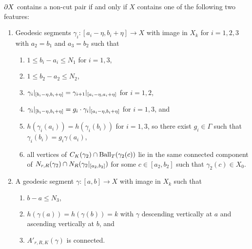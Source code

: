 \begin{prop}\label{prop:noncutpairfeature} $\partial X$ contains a non-cut
pair if and only if $X$ contains one of the following two features:
\begin{enumerate}
  \item Geodesic segments $\gamma_i \colon [a_i - \eta, b_i + \eta] \to X$ with
    image in $X_k$ for $i = 1, 2, 3$ with $a_2 = b_1$ and $a_3 = b_2$ such that
    \begin{enumerate}
      \item\label{noncutpairshortout} $1 \leq b_i - a_i \leq N_1$ for $i = 1,
        3$,
      \item\label{noncutpairshortin} $1 \leq b_2 - a_2 \leq N_2$,
      \item\label{noncutpairlocal1} $\gamma_i\vert_{[b_i - \eta, b_i +
        \eta]} = \gamma_{i+1}\vert_{[a_i - \eta, a_i + \eta]}$ for $i = 1,
        2$,
      \item\label{noncutpairlocal2} $\gamma_i\vert_{[b_i - \eta, b_i +
        \eta]} = g_i \cdot\gamma_i\vert_{[a_i - \eta, b_i + \eta]}$ for $i
        = 1, 3$, and
      \item\label{noncutpairdepth} $h(\gamma_i(a_i)) = h(\gamma_i(b_i))$ for $i
        = 1, 3$, so there exist $g_i \in \Gamma$ such that $\gamma_i(b_i) =
        g_i\gamma(a_i)$,
      \item\label{noncutpairconnected} all vertices of $C_K(\gamma_2)
        \cap \operatorname{\mathrm{Ball}}_T(\gamma_2(c))$ lie in the same connected component of
        $N_{r, R}(\gamma_2) \cap N_R(\gamma_2\vert_{[a_2, b_2]})$
        for some $c \in [a_2, b_2]$ such that $\gamma_2(c) \in X_0$.
    \end{enumerate}
  \item A geodesic segment $\gamma \colon [a, b] \to X$ with image in $X_k$ such that
  \begin{enumerate}
    \item $b - a \leq N_3$,
    \item $h(\gamma(a)) = h(\gamma(b)) = k$ with $\gamma$ descending vertically
      at $a$ and ascending vertically at $b$, and
    \item $A'_{r, R, K}(\gamma)$ is connected.
  \end{enumerate}
\end{enumerate}
\end{prop}

